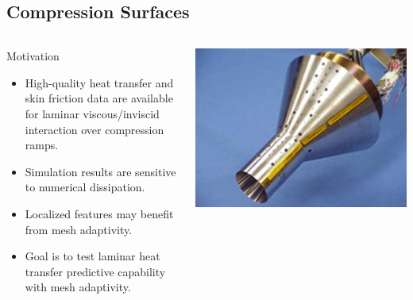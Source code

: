 \documentclass[compress,11pt]{beamer}
\begin{document}
\subsection{Compression Surfaces}
\frame
{
  \begin{columns}[t]
    \begin{block}{Motivation}
      \footnotesize
      \begin{itemize}
	\item High-quality heat transfer and skin friction data are available for laminar viscous/inviscid interaction over compression ramps.
	\item Simulation results are sensitive to numerical dissipation.
	\item Localized features may benefit from mesh adaptivity.
	\item Goal is to test laminar heat transfer predictive capability with mesh adaptivity.
      \end{itemize}
    \end{block}
    
      \vspace{-1em}
      \begin{center}
	\includegraphics[width=\textwidth]{figures/holden_hollow_cylinder/test_article} \vspace{.5em}
	

\end{center}
\end{columns}}
\end{document}
